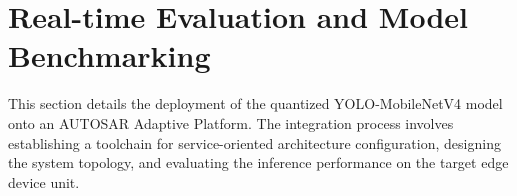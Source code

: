 \section{Real-time Evaluation and Model Benchmarking}
\label{sec:integrating}

This section details the deployment of the quantized YOLO-MobileNetV4 model onto an AUTOSAR Adaptive Platform. The integration process involves establishing a toolchain for service-oriented architecture configuration, designing the system topology, and evaluating the inference performance on the target edge device unit.


    
    

